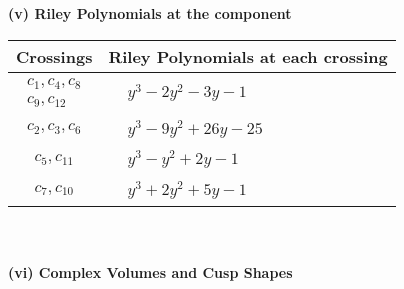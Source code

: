 \documentclass[1p]{elsarticle_modified}
\theoremstyle{definition}
\begin{document}
\newpage\renewcommand{\arraystretch}{1}
\flushleft \textbf{(v) Riley Polynomials at the component}\newline \\
\begin{tabular}{m{50pt}|m{274pt}}
Crossings & \hspace{64pt}Riley Polynomials at each crossing \\
\hline $$\begin{aligned}c_{1},c_{4},c_{8}\\c_{9},c_{12}\end{aligned}$$&$\begin{aligned}
&y^3-2 y^2-3 y-1
\end{aligned}$\\
\hline $$\begin{aligned}c_{2},c_{3},c_{6}\end{aligned}$$&$\begin{aligned}
&y^3-9 y^2+26 y-25
\end{aligned}$\\
\hline $$\begin{aligned}c_{5},c_{11}\end{aligned}$$&$\begin{aligned}
&y^3- y^2+2 y-1
\end{aligned}$\\
\hline $$\begin{aligned}c_{7},c_{10}\end{aligned}$$&$\begin{aligned}
&y^3+2 y^2+5 y-1
\end{aligned}$\\
\hline
\end{tabular}\\~\\
\newpage\flushleft \textbf{(vi) Complex Volumes and Cusp Shapes}
\end{document}
